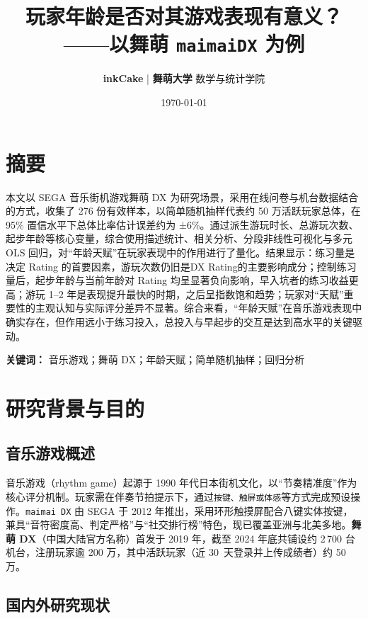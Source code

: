 \documentclass[12pt]{article}
\title{玩家年龄是否对其游戏表现有意义？\\——以舞萌 \texttt{maimaiDX} 为例}
\author{\textbf{inkCake} | \textbf{舞萌大学 } 数学与统计学院}
\date{\today}
\begin{document}
	\maketitle
	
\section*{摘要}
本文以 SEGA 音乐街机游戏舞萌 DX 为研究场景，采用在线问卷与机台数据结合的方式，收集了 276 份有效样本，以简单随机抽样代表约 50 万活跃玩家总体，在 95\% 置信水平下总体比率估计误差约为 ±6\%。通过派生游玩时长、总游玩次数、起步年龄等核心变量，综合使用描述统计、相关分析、分段非线性可视化与多元 OLS 回归，对“年龄天赋”在玩家表现中的作用进行了量化。结果显示：练习量是决定 Rating 的首要因素，游玩次数仍旧是DX Rating的主要影响成分；控制练习量后，起步年龄与当前年龄对 Rating 均呈显著负向影响，早入坑者的练习收益更高；游玩 1–2 年是表现提升最快的时期，之后呈指数饱和趋势；玩家对“天赋”重要性的主观认知与实际评分差异不显著。综合来看，“年龄天赋”在音乐游戏表现中确实存在，但作用远小于练习投入，总投入与早起步的交互是达到高水平的关键驱动。

	
	\vspace{1em}
	\noindent\textbf{关键词：} 音乐游戏；舞萌 DX；年龄天赋；简单随机抽样；回归分析
	
	
	\newpage
\section{研究背景与目的}

\subsection{音乐游戏概述}

音乐游戏（rhythm game）起源于 1990 年代日本街机文化，以“节奏精准度”作为核心评分机制。玩家需在伴奏节拍提示下，通过\texttt{按键、触屏或体感}等方式完成预设操作。\texttt{maimai DX} 由 SEGA 于 2012 年推出，采用环形触摸屏配合八键实体按键，兼具“音符密度高、判定严格”与“社交排行榜”特色，现已覆盖亚洲与北美多地。\textbf{舞萌 DX}（中国大陆官方名称）首发于 2019 年，截至 2024 年底共铺设约 2\,700 台机台，注册玩家逾 200 万，其中活跃玩家（近 30~天登录并上传成绩者）约 50 万。

\subsection{国内外研究现状}
\end{document}

